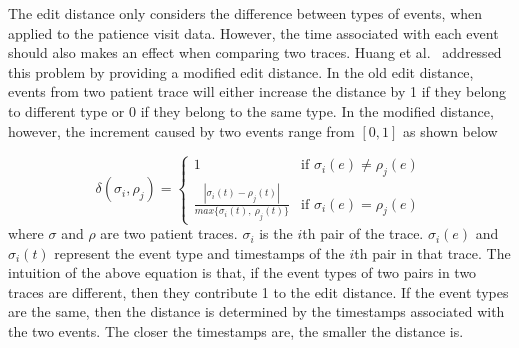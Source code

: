 The edit distance only considers the difference between types of events, when applied to the patience visit data. However, the time associated with each event should also makes an effect when comparing two traces. Huang et al.~\cite{huang2012anomaly} addressed this problem by providing a modified edit distance. In the old edit distance, events from two patient trace will either increase the distance by 1 if they belong to different type or 0 if they belong to the same type. In the modified distance, however, the increment caused by two events range from $\left[ 0, 1\right] $ as shown below

\begin{equation*}
\delta(\sigma_i, \rho_j) = \begin{cases} 
   1 & \text{if } \sigma_i(e) \neq \rho_j(e) \\
   \frac{| \sigma_i(t) - \rho_j(t) | }{max\{\sigma_i(t),~ \rho_j(t)\}}       & \text{if } \sigma_i(e) = \rho_j(e)
  \end{cases}
\end{equation*}
where $\sigma$ and $\rho$ are two patient traces. $\sigma_i$ is the $i$th pair of the trace. $\sigma_i(e)$ and $\sigma_i(t)$ represent the event type and timestamps of the $i$th pair in that trace. The intuition of the above equation is that, if the event types of two pairs in two traces are different, then they contribute 1 to the edit distance. If the event types are the same, then the distance is determined by the timestamps associated with the two events. The closer the timestamps are, the smaller the distance is. 

